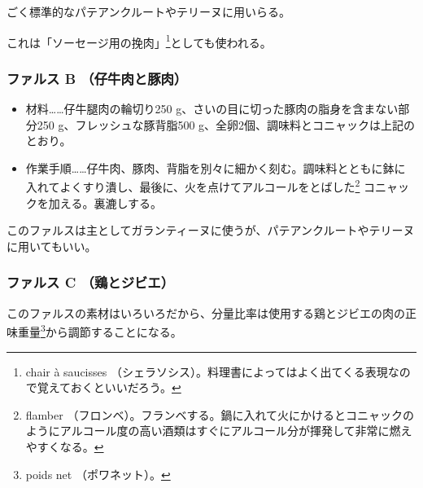 \begin{recette}
ごく標準的なパテアンクルートやテリーヌに用いらる。

これは「\protect\hypertarget{chair-a-saucisse}{ソーセージ用の挽肉}」\footnote{chair
  à saucisses
  （シェラソシス）。料理書によってはよく出てくる表現なので覚えておくといいだろう。}としても使われる。\label{chair-a-saucisse}

\atoaki{}

\hypertarget{farce-froide-b}{%
\subsubsection{ファルス B （仔牛肉と豚肉）}\label{farce-froide-b}}



\begin{itemize}
\item
  材料\ldots{}\ldots{}仔牛腿肉の輪切り250
  g、さいの目に切った豚肉の脂身を含まない部分250
  g、フレッシュな豚背脂500
  g、全卵2個、調味料とコニャックは上記のとおり。
\item
  作業手順\ldots{}\ldots{}仔牛肉、豚肉、背脂を別々に細かく刻む。調味料とともに鉢に入れてよくすり潰し、最後に、火を点けてアルコールをとばした\footnote{flamber
    （フロンベ）。フランベする。鍋に入れて火にかけるとコニャックのようにアルコール度の高い酒類はすぐにアルコール分が揮発して非常に燃えやすくなる。}
  コニャックを加える。裏漉しする。
\end{itemize}

このファルスは主としてガランティーヌに使うが、パテアンクルートやテリーヌに用いてもいい。

\atoaki{}

\hypertarget{farce-froide-c}{%
\subsubsection{ファルス C （鶏とジビエ）}\label{farce-froide-c}}



このファルスの素材はいろいろだから、分量比率は使用する鶏とジビエの肉の正味重量\footnote{poids
  net （ポワネット）。}から調節することになる。


\end{recette}
